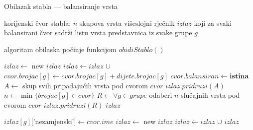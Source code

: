 \begin{algorithm}[h!]

\centering
\caption{Obilazak stabla --- balansiranje vrsta}
\label{algo:balance}

\begin{algorithmic}[1]

\Require korijenski čvor stabla; $n$ skupova vrsta
\Ensure višeslojni rječnik $izlaz$ koji za svaki balansirani čvor sadrži
listu vrsta predstavnica iz svake grupe $g$  

\State \Comment algoritam obilaska počinje funkcijom $obidiStablo()$

    \State $izlaz \gets$ new $izlaz$
        \State $izlaz \gets izlaz$ $\cup$ 
                \State $cvor.brojac[g] \gets cvor.brojac[g] + dijete.brojac[g]$
            \EndFor
        \EndIf
    \EndFor
        \State $cvor.balansiran \gets \textbf{istina}$
            \State $A \gets$ skup svih pripadajućih vrsta pod cvorom $cvor$
            \State $izlaz.pridruzi(A)$
        \Else
            \State $n \gets \min\{brojac[g] \in cvor\}$
            \State $R \gets \forall g \in grupe$ odaberi $n$ slučajnih vrsta pod
cvorom $cvor$
            \State $izlaz.pridruzi(R)$
        \EndIf
    \EndIf
    \State \Return $izlaz$
\EndFunction

%

        \State \Return {}
    \Else
                \State $izlaz[g][$'nezamjenski'$] \gets cvor.ime$
            \EndFor
        \Else
            \State $izlaz \gets$ new $izlaz$
                    \State $izlaz \gets izlaz$ $\cup$ 
                \EndIf
            \EndFor
        \EndIf
    \EndIf
    \State \Return $izlaz$
\EndFunction

\end{algorithmic}
\end{algorithm}  
